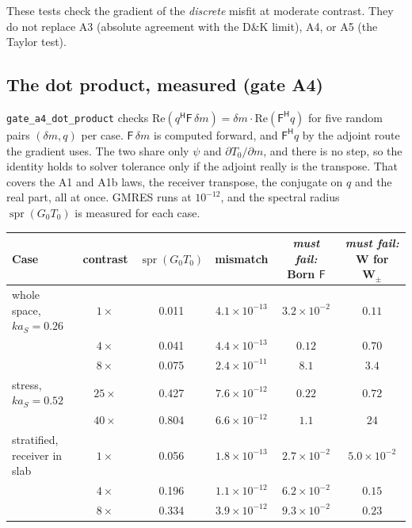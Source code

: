 \documentclass[11pt,a4paper]{article}
\newcommand{\Tz}{T_0}
\newcommand{\Gz}{G_0}
\newcommand{\bW}{\mathbf{W}}
\begin{document}
These tests check the gradient of the \emph{discrete} misfit at moderate contrast. They do not
replace A3 (absolute agreement with the D\&K limit), A4, or A5 (the Taylor test).

\subsection{The dot product, measured (gate A4)}\label{sec:a4}

\nolinkurl{gate_a4_dot_product} checks $\mathrm{Re}(q^{\mathsf H}\mathsf{F}\,\delta m) =
\delta m\cdot\mathrm{Re}(\mathsf{F}^{\mathsf H}q)$ for five random pairs $(\delta m, q)$ per case. $\mathsf{F}\,\delta m$
is computed forward, and $\mathsf{F}^{\mathsf H}q$ by the adjoint route the gradient uses. The two share only
$\psi$ and $\partial\Tz/\partial m$, and there is no step, so the identity holds to solver
tolerance only if the adjoint really is the transpose. That covers the A1 and A1b laws, the
receiver transpose, the conjugate on $q$ and the real part, all at once. GMRES runs at
$10^{-12}$, and the spectral radius $\operatorname{spr}(\Gz\Tz)$ is measured for each case.

\begin{center}
\small
\setlength{\tabcolsep}{4pt}\begin{tabular}{@{}lccccc@{}}
\toprule
Case & contrast & $\operatorname{spr}(\Gz\Tz)$ & mismatch & \emph{must fail:} Born $\mathsf{F}$ & \emph{must fail:} $\bW$ for $\mathbf{W}_{\pm}$ \\
\midrule
whole space, $ka_S=0.26$ & $1\times$ & 0.011 & $4.1\times10^{-13}$ & $3.2\times10^{-2}$ & $0.11$ \\
 & $4\times$ & 0.041 & $4.4\times10^{-13}$ & $0.12$ & $0.70$ \\
 & $8\times$ & 0.075 & $2.4\times10^{-11}$ & $8.1$ & $3.4$ \\
stress, $ka_S=0.52$ & $25\times$ & 0.427 & $7.6\times10^{-12}$ & $0.22$ & $0.72$ \\
 & $40\times$ & 0.804 & $6.6\times10^{-12}$ & $1.1$ & $24$ \\
stratified, receiver in slab & $1\times$ & 0.056 & $1.8\times10^{-13}$ & $2.7\times10^{-2}$ & $5.0\times10^{-2}$ \\
 & $4\times$ & 0.196 & $1.1\times10^{-12}$ & $6.2\times10^{-2}$ & $0.15$ \\
 & $8\times$ & 0.334 & $3.9\times10^{-12}$ & $9.3\times10^{-2}$ & $0.23$ \\
\bottomrule
\end{tabular}
\end{center}
\end{document}

